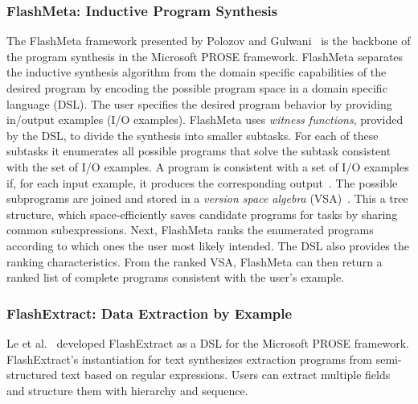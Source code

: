 \subsubsection{FlashMeta: Inductive Program Synthesis}
The FlashMeta framework presented by Polozov and
Gulwani~\cite{polozov2015flashmeta:} is the backbone of the program
synthesis in the Microsoft PROSE framework. FlashMeta separates the
inductive synthesis algorithm from the domain specific capabilities of
the desired program by encoding the possible program space in a domain
specific language (DSL). The user specifies the desired program
behavior by providing in/output examples (I/O examples). FlashMeta
uses \emph{witness functions}, provided by the DSL, to divide the
synthesis into smaller subtasks. For each of these subtasks it
enumerates all possible programs that solve the subtask consistent
with the set of I/O examples. A program is consistent with a set of
I/O examples if, for each input example, it produces the corresponding
output~\cite{mitchell1982generalization}. The possible subprograms are
joined and stored in a \emph{version space algebra}
(VSA)~\cite{mitchell1982generalization}. This a tree structure, which
space-efficiently saves candidate programs for tasks by sharing common
subexpressions. Next, FlashMeta ranks the enumerated programs
according to which ones the user most likely intended. The DSL also
provides the ranking characteristics. From the ranked VSA, FlashMeta
can then return a ranked list of complete programs consistent with the
user's example.



\subsubsection{FlashExtract: Data Extraction by Example}
Le et al.~\cite{le2014flashextract:} developed FlashExtract as a DSL
for the Microsoft PROSE framework.
FlashExtract's instantiation for text synthesizes extraction programs
from semi-structured text based on regular expressions. Users can
extract multiple fields and structure them with hierarchy and
sequence.


